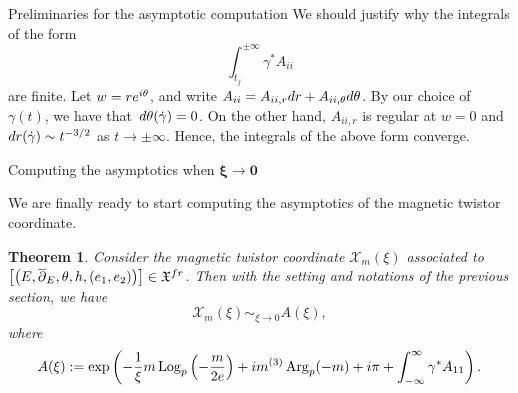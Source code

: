 \documentclass[11pt]{article}
\numberwithin{equation}{section}
\newtheorem{Theorem}{Theorem}[section]
\numberwithin{equation}{section}
\newcommand{\MC}{\mathcal{X}_m}
\begin{document}
\begin{subsubsection}{Preliminaries for the asymptotic computation}
We should justify why the integrals of the form
\begin{equation}\label{finitenessint}
 \int_{t_j}^{\pm \infty} \gamma^*A_{ii}
\end{equation}
are finite. Let $w=r{\rm e}^{{\rm i}\theta}$, and write $A_{ii}=A_{ii,r}{\rm d}r+A_{ii,\theta}{\rm d}\theta$. By our choice of $\gamma(t)$, we have that~${{\rm d}\theta(\dot{\gamma})=0}$. On the other hand, $A_{ii,r}$ is regular at $w=0$ and ${\rm d}r(\dot{\gamma})\sim t^{-3/2}$ as $t \to \pm \infty$. Hence, the integrals of the above form converge.
\end{subsubsection}

\begin{subsubsection}{Computing the asymptotics when $\boldsymbol{\xi \to 0}$}\label{asymp0}

We are finally ready to start computing the asymptotics of the magnetic twistor coordinate.

\begin{Theorem} \label{a0} Consider the magnetic twistor coordinate $\MC(\xi)$ associated to $\bigl[\bigl(E,\overline{\partial}_E,\theta,h,\allowbreak(e_1,e_2)\bigr)\bigr]\in \mathfrak{X}^{{\rm fr}}$. Then with the setting and notations of the previous section, we have
\begin{equation*}
 \MC(\xi)\sim_{\xi \to 0} A(\xi),
\end{equation*}
where
\begin{equation*}
A(\xi):=\exp \left(-\frac{1}{\xi}m\operatorname{Log}_p\left(-\frac{m}{2e}\right)+{\rm i}m^{(3)}\operatorname{Arg}_p(-m)+{\rm i}\pi
+\int_{-\infty}^{\infty}\gamma^*A_{11}\right).
\end{equation*}

\end{Theorem}


\end{subsubsection}
\end{document}
